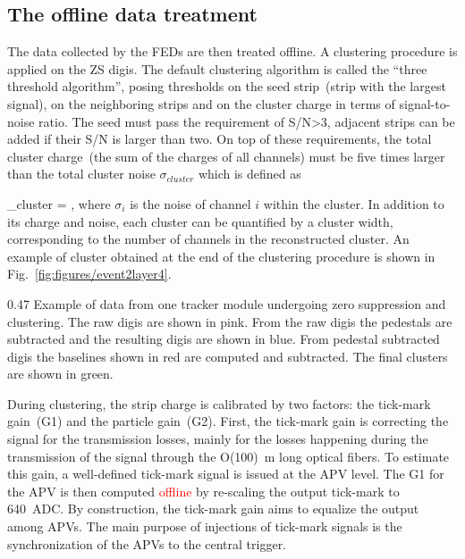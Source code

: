 \subsection{The offline data treatment~\label{sec:localreco}}


The data collected by the FEDs are then treated offline. A clustering procedure is applied on the ZS digis. The default clustering algorithm is called the ``three threshold algorithm'', posing thresholds on the seed strip~(strip with the largest signal), on the neighboring strips and on the cluster charge in terms of signal-to-noise ratio. The seed must pass the requirement of S/N>3, adjacent strips can be added if their S/N is larger than two. On top of these requirements, the total cluster charge~(the sum of the charges of all channels) must be five times larger than the total cluster noise $\sigma_{cluster}$ which is defined as


{
    \sigma_{cluster} = ,
}
where $\sigma_{i}$ is the noise of channel $i$ within the cluster. In addition to its charge and noise, each cluster can be quantified by a cluster width, corresponding to the number of channels in the reconstructed cluster. An example of cluster obtained at the end of the clustering procedure is shown in Fig.~\ref{fig:figures/event2layer4}.

                 {0.47}       %
                 {Example of data from one tracker module undergoing zero suppression and clustering. The raw digis are shown in pink. From the raw digis the pedestals are subtracted and the resulting digis are shown in blue. From pedestal subtracted digis the baselines shown in red are computed and subtracted. The final clusters are shown in green.} %


During clustering, the strip charge is calibrated by two factors: the tick-mark gain~(G1) and the particle gain~(G2). First, the tick-mark gain is correcting the signal for the transmission losses, mainly for the losses happening during the transmission of the signal through the O(100)~m long optical fibers. To estimate this gain, a well-defined tick-mark signal is issued at the APV level. The G1 for the APV is then computed \textcolor{red}{offline} by re-scaling the output tick-mark to 640~ADC. By construction, the tick-mark gain aims to equalize the output among APVs. The main purpose of injections of tick-mark signals is the synchronization of the APVs to the central trigger.


